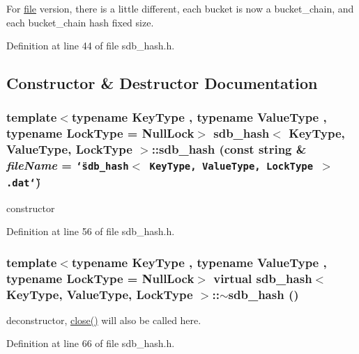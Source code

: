 For \hyperlink{classfile}{file} version, there is a little different, each bucket is now a bucket\_\-chain, and each bucket\_\-chain hash fixed size. 

Definition at line 44 of file sdb\_\-hash.h.

\subsection{Constructor \& Destructor Documentation}
\hypertarget{classsdb__hash_02cd69cf8f60ae7f8661b1499d49c453}{
\subsubsection[{sdb\_\-hash}]{\setlength{\rightskip}{0pt plus 5cm}template$<$typename KeyType , typename ValueType , typename LockType  = NullLock$>$ {\bf sdb\_\-hash}$<$ KeyType, ValueType, LockType $>$::{\bf sdb\_\-hash} (const string \& {\em fileName} = {\tt \char`\"{}sdb\_\-hash$<$~KeyType,~ValueType,~LockType~$>$.dat\char`\"{}})}}
\label{classsdb__hash_02cd69cf8f60ae7f8661b1499d49c453}


constructor 

Definition at line 56 of file sdb\_\-hash.h.\hypertarget{classsdb__hash_607bf8eee5de43ee297a5e7ef7c0f56d}{
\subsubsection[{$\sim$sdb\_\-hash}]{\setlength{\rightskip}{0pt plus 5cm}template$<$typename KeyType , typename ValueType , typename LockType  = NullLock$>$ virtual {\bf sdb\_\-hash}$<$ KeyType, ValueType, LockType $>$::$\sim${\bf sdb\_\-hash} ()}}
\label{classsdb__hash_607bf8eee5de43ee297a5e7ef7c0f56d}


deconstructor, \hyperlink{classsdb__hash_2ebf3f46da2bfa6249badf1d1af352f2}{close()} will also be called here. 

Definition at line 66 of file sdb\_\-hash.h.

